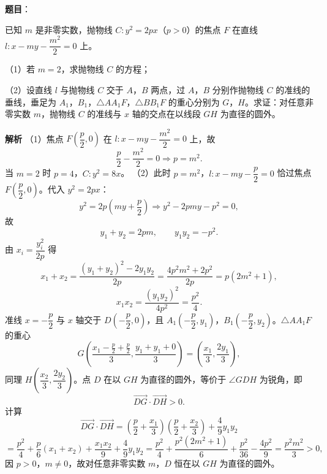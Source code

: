 \begin{answer}

\textbf{题目}：

已知 $m$ 是非零实数，抛物线 $C:y^2=2px$（$p>0$）的焦点 $F$ 在直线 $l:x-my-\dfrac{m^2}{2}=0$ 上。

（1）若 $m=2$，求抛物线 $C$ 的方程；

（2）设直线 $l$ 与抛物线 $C$ 交于 $A$，$B$ 两点，过 $A$，$B$ 分别作抛物线 $C$ 的准线的垂线，垂足为 $A_1$，$B_1$，$\triangle AA_1F$，$\triangle BB_1F$ 的重心分别为 $G$，$H$。求证：对任意非零实数 $m$，抛物线 $C$ 的准线与 $x$ 轴的交点在以线段 $GH$ 为直径的圆外。
\nopagebreak[4]
\begin{center}\end{center}
\nopagebreak[4]
\textbf{解析}
（1）焦点 $F\left(\dfrac p2,0\right)$ 在 $l:x-my-\dfrac{m^2}2=0$ 上，故
\nopagebreak[4]
\[\frac p2-\frac{m^2}2=0\Rightarrow p=m^2.\]
当 $m=2$ 时 $p=4$，$C:y^2=8x$。
（2）此时 $p=m^2$，$l:x-my-\dfrac p2=0$ 恰过焦点 $F\left(\dfrac p2,0\right)$。代入 $y^2=2px$：
\nopagebreak[4]
\[y^2=2p\left(my+\frac p2\right)\Rightarrow y^2-2pmy-p^2=0,\]
故
\nopagebreak[4]
\[y_1+y_2=2pm,\qquad y_1y_2=-p^2.\]
由 $x_i=\dfrac{y_i^2}{2p}$ 得
\nopagebreak[4]
\[x_1+x_2=\frac{(y_1+y_2)^2-2y_1y_2}{2p}=\frac{4p^2m^2+2p^2}{2p}=p(2m^2+1),\]
\nopagebreak[4]
\[x_1x_2=\frac{(y_1y_2)^2}{4p^2}=\frac{p^2}4.\]
准线 $x=-\dfrac p2$ 与 $x$ 轴交于 $D\left(-\dfrac p2,0\right)$，且 $A_1\left(-\dfrac p2,y_1\right)$，$B_1\left(-\dfrac p2,y_2\right)$。$\triangle AA_1F$ 的重心
\nopagebreak[4]
\[G\left(\frac{x_1-\frac p2+\frac p2}3,\frac{y_1+y_1+0}3\right)=\left(\frac{x_1}3,\frac{2y_1}3\right),\]
同理 $H\left(\dfrac{x_2}3,\dfrac{2y_2}3\right)$。点 $D$ 在以 $GH$ 为直径的圆外，等价于 $\angle GDH$ 为锐角，即
\nopagebreak[4]
\[\overrightarrow{DG}\cdot\overrightarrow{DH}>0.\]
计算
\nopagebreak[4]
\[\overrightarrow{DG}\cdot\overrightarrow{DH}
=\left(\frac p2+\frac{x_1}3\right)\left(\frac p2+\frac{x_2}3\right)+\frac49y_1y_2\]
\nopagebreak[4]
\[=\frac{p^2}4+\frac p6(x_1+x_2)+\frac{x_1x_2}9+\frac49y_1y_2
=\frac{p^2}4+\frac{p^2(2m^2+1)}6+\frac{p^2}{36}-\frac{4p^2}9=\frac{p^2m^2}3>0,\]
因 $p>0$，$m\neq0$，故对任意非零实数 $m$，$D$ 恒在以 $GH$ 为直径的圆外。


\end{answer}